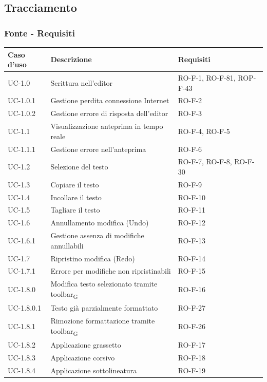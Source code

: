 \documentclass[11pt,a4paper]{article}
\newcommand{\gls}[1]{#1\textsubscript{G}}
\begin{document}
\newpage

\subsection{Tracciamento}
\subsubsection{Fonte - Requisiti}
\begin{longtable}{|p{}|p{}|>{\raggedright\arraybackslash}p{}|}
\hline
\textbf{Caso d'uso} & \textbf{Descrizione} & \textbf{Requisiti} \\
\hline
\endhead
UC-1.0 & Scrittura nell'editor & RO-F-1, RO-F-81, ROP-F-43 \\
\hline
UC-1.0.1 & Gestione perdita connessione Internet & RO-F-2 \\
\hline
UC-1.0.2 & Gestione errore di risposta dell'editor & RO-F-3 \\
\hline
UC-1.1 & Visualizzazione anteprima in tempo reale & RO-F-4, RO-F-5 \\
\hline
UC-1.1.1 & Gestione errore nell'anteprima & RO-F-6 \\
\hline
UC-1.2 & Selezione del testo & RO-F-7, RO-F-8, RO-F-30 \\
\hline
UC-1.3 & Copiare il testo & RO-F-9 \\
\hline
UC-1.4 & Incollare il testo & RO-F-10 \\
\hline
UC-1.5 & Tagliare il testo & RO-F-11 \\
\hline
UC-1.6 & Annullamento modifica (Undo) & RO-F-12 \\
\hline
UC-1.6.1 & Gestione assenza di modifiche annullabili & RO-F-13 \\
\hline
UC-1.7 & Ripristino modifica (Redo) & RO-F-14 \\
\hline
UC-1.7.1 & Errore per modifiche non ripristinabili & RO-F-15 \\
\hline
UC-1.8.0 & Modifica testo selezionato tramite \gls{toolbar} & RO-F-16 \\
\hline
UC-1.8.0.1 & Testo già parzialmente formattato & RO-F-27 \\
\hline
UC-1.8.1 & Rimozione formattazione tramite \gls{toolbar} & RO-F-26 \\
\hline
UC-1.8.2 & Applicazione grassetto & RO-F-17 \\
\hline
UC-1.8.3 & Applicazione corsivo & RO-F-18 \\
\hline
UC-1.8.4 & Applicazione sottolineatura & RO-F-19 \\

\end{longtable}
\end{document}
